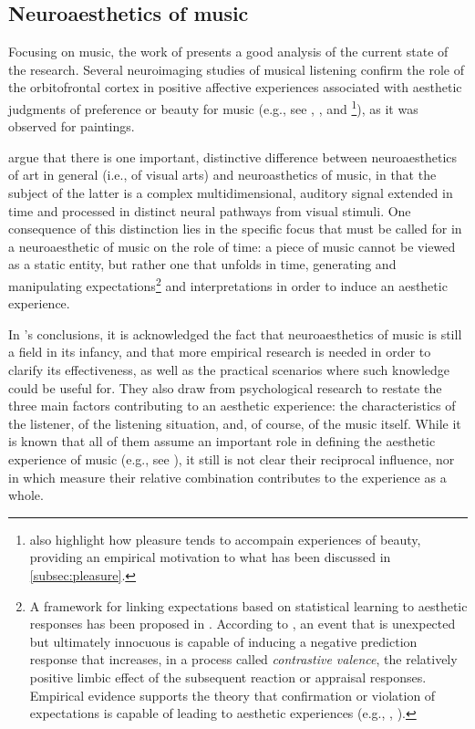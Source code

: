 \subsection{Neuroaesthetics of music}\label{subsec:music-neuroaesthetics}
Focusing on music, the work of \cite{brattico2013neuroaesthetics} presents a good analysis of the current state of the research. Several neuroimaging studies of musical listening confirm the role of the orbitofrontal cortex in positive affective experiences associated with aesthetic judgments of preference or beauty for music (e.g., see \cite{alluri2012large}, \cite{brattico2011functional}, and \cite{blood2001intensely}\footnote{\citeauthor{blood2001intensely} also highlight how pleasure tends to accompain experiences of beauty, providing an empirical motivation to what has been discussed in \autoref{subsec:pleasure}.}), as it was observed for paintings.

\citeauthor{brattico2013neuroaesthetics} argue that there is one important, distinctive difference between neuroaesthetics of art in general (i.e., of visual arts) and neuroasthetics of music, in that the subject of the latter is a complex multidimensional, auditory signal extended in time and processed in distinct neural pathways from visual stimuli. One consequence of this distinction lies in the specific focus that must be called for in a neuroaesthetic of music on the role of time: a piece of music cannot be viewed as a static entity, but rather one that unfolds in time, generating and manipulating expectations\footnote{A framework for linking expectations based on statistical learning to aesthetic responses has been proposed in \cite{huron2006sweet}. According to \citeauthor{huron2006sweet}, an event that is unexpected but ultimately innocuous is capable of inducing a negative prediction response that increases, in a process called \emph{contrastive valence}, the relatively positive limbic effect of the subsequent reaction or appraisal responses. Empirical evidence supports the theory that confirmation or violation of expectations is capable of leading to
aesthetic experiences (e.g., \cite{vitz1966affect}, \cite{crozier1974verbal}).} and interpretations in order to induce an aesthetic experience.

In \citeauthor{brattico2013neuroaesthetics}'s conclusions, it is acknowledged the fact that neuroaesthetics of music is still a field in its infancy, and that more empirical research is needed in order to clarify its effectiveness, as well as the practical scenarios where such knowledge could be useful for. They also draw from psychological research to restate the three main factors contributing to an aesthetic experience: the characteristics of the listener, of the listening situation, and, of course, of the music itself. While it is known that all of them assume an important role in defining the aesthetic experience of music (e.g., see \cite{hargreaves201021}), it still is not clear their reciprocal influence, nor in which measure their relative combination contributes to the experience as a whole.


